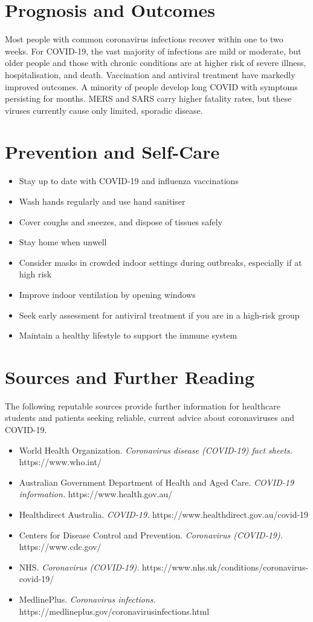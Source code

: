 \section*{Prognosis and Outcomes}
Most people with common coronavirus infections recover within one to two weeks. For COVID-19, the vast majority of infections are mild or moderate, but older people and those with chronic conditions are at higher risk of severe illness, hospitalisation, and death. Vaccination and antiviral treatment have markedly improved outcomes. A minority of people develop long COVID with symptoms persisting for months. MERS and SARS carry higher fatality rates, but these viruses currently cause only limited, sporadic disease.

\section*{Prevention and Self-Care}
\begin{itemize}
    \item Stay up to date with COVID-19 and influenza vaccinations
    \item Wash hands regularly and use hand sanitiser
    \item Cover coughs and sneezes, and dispose of tissues safely
    \item Stay home when unwell
    \item Consider masks in crowded indoor settings during outbreaks, especially if at high risk
    \item Improve indoor ventilation by opening windows
    \item Seek early assessment for antiviral treatment if you are in a high-risk group
    \item Maintain a healthy lifestyle to support the immune system
\end{itemize}

\section*{Sources and Further Reading}
The following reputable sources provide further information for healthcare students and patients seeking reliable, current advice about coronaviruses and COVID-19.

\begin{itemize}
    \item World Health Organization. \textit{Coronavirus disease (COVID-19) fact sheets.} https://www.who.int/
    \item Australian Government Department of Health and Aged Care. \textit{COVID-19 information.} https://www.health.gov.au/
    \item Healthdirect Australia. \textit{COVID-19.} https://www.healthdirect.gov.au/covid-19
    \item Centers for Disease Control and Prevention. \textit{Coronavirus (COVID-19).} https://www.cdc.gov/
    \item NHS. \textit{Coronavirus (COVID-19).} https://www.nhs.uk/conditions/coronavirus-covid-19/
    \item MedlinePlus. \textit{Coronavirus infections.} https://medlineplus.gov/coronavirusinfections.html
\end{itemize}
